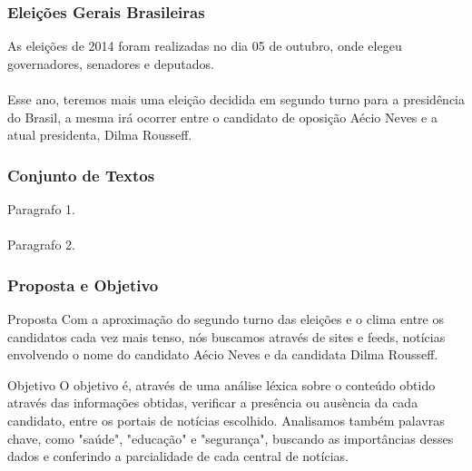 
\begin{frame}
\frametitle{Eleições Gerais Brasileiras}
As eleições de 2014 foram realizadas no dia 05 de outubro, onde elegeu governadores, senadores e deputados.
\\~\\
Esse ano, teremos mais uma eleição decidida em segundo turno para a presidência do Brasil, a mesma irá ocorrer entre o candidato de oposição Aécio Neves e a atual presidenta, Dilma Rousseff.
\end{frame}


\begin{frame}
\frametitle{Conjunto de Textos}
Paragrafo 1.
\\~\\
Paragrafo 2.
\end{frame}


\begin{frame}
\frametitle{Proposta e Objetivo}
\begin{block}{Proposta}
Com a aproximação do segundo turno das eleições e o clima entre os candidatos cada vez mais tenso, nós buscamos através de sites e feeds, notícias envolvendo o nome do candidato Aécio Neves e da candidata Dilma Rousseff.
\end{block}

\begin{block}{Objetivo}
O objetivo é, através de uma análise léxica sobre o conteúdo obtido através das informações obtidas, verificar a presência ou ausència da cada candidato, entre os portais de notícias escolhido. Analisamos também palavras chave, como "saúde", "educação" e "segurança", buscando as importâncias desses dados e conferindo a parcialidade de cada central de notícias.
\end{block}
\end{frame}

